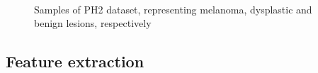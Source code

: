 \begin{figure}
\begin{center}
	\
	\
	\caption{Samples of PH2 dataset, representing melanoma, dysplastic and benign lesions, respectively}
	\label{fig:PH2samples}
\end{center}	
\end{figure}

\subsection{Feature extraction}\label{sec:feat}

